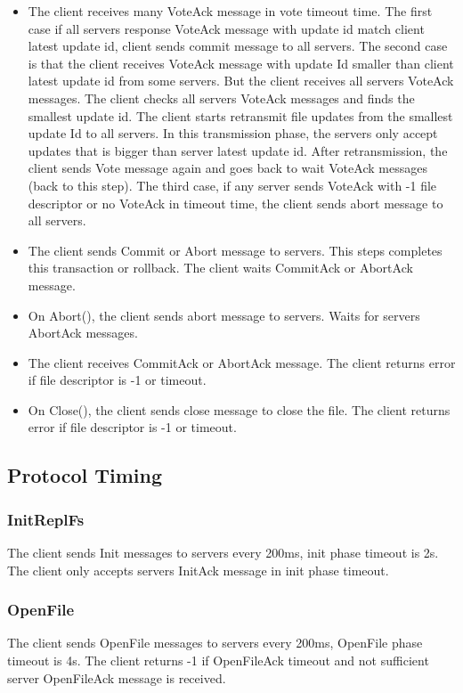 \documentclass[12pt,fleqn]{article}
\begin{document}
\begin{itemize}
	\item The client receives many VoteAck message in vote timeout time. The first case if all servers response VoteAck message with update id match client latest update id, client sends commit message to all servers. The second case is that the client receives VoteAck message with update Id smaller than client latest update id from some servers. But the client receives all servers VoteAck messages. The client checks all servers VoteAck messages and finds the smallest update id. The client starts retransmit file updates from the smallest update Id to all servers. In this transmission phase, the servers only accept updates that is bigger than server latest update id. After retransmission, the client sends Vote message again and goes back to wait VoteAck messages (back to this step). The third case, if any server sends VoteAck with -1 file descriptor or no VoteAck in timeout time, the client sends abort message to all servers.
	\item The client sends Commit or Abort message to servers. This steps completes this transaction or rollback. The client waits CommitAck or AbortAck message.
	\item On Abort(), the client sends abort message to servers. Waits for servers AbortAck messages.
	\item The client receives CommitAck or AbortAck message. The client returns error if file descriptor is -1 or timeout.
	\item  On Close(), the client sends close message to close the file. The client returns error if file descriptor is -1 or timeout.
\end{itemize}

\subsection{Protocol Timing}
\subsubsection{InitReplFs}
The client sends Init messages to servers every 200ms, init phase timeout is 2s. The client only accepts servers InitAck message in init phase timeout.

\subsubsection{OpenFile}
The client sends OpenFile messages to servers every 200ms, OpenFile phase timeout is 4s. The client returns -1 if OpenFileAck timeout and not sufficient server OpenFileAck message is received.
\end{document}
